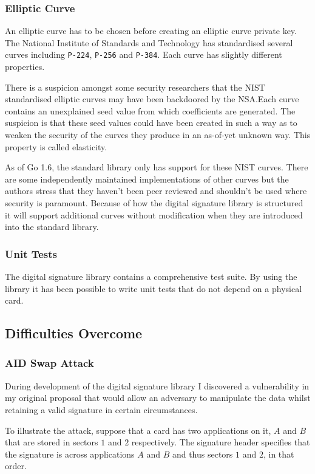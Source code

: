 \documentclass[dissertation.tex]{subfiles}
\begin{document}
  \subsubsection{Elliptic Curve}
  An elliptic curve has to be chosen before creating an elliptic curve private key. The National Institute of Standards and Technology has standardised several curves including \texttt{P-224}, \texttt{P-256} and \texttt{P-384}. Each curve has slightly different properties.

  There is a suspicion amongst some security researchers that the NIST standardised elliptic curves may have been backdoored by the NSA.\@ Each curve contains an unexplained seed value from which coefficients are generated. The suspicion is that these seed values could have been created in such a way as to weaken the security of the curves they produce in an as-of-yet unknown way. This property is called elasticity.

  As of Go 1.6, the standard library only has support for these NIST curves. There are some independently maintained implementations of other curves but the authors stress that they haven't been peer reviewed and shouldn't be used where security is paramount. Because of how the digital signature library is structured it will support additional curves without modification when they are introduced into the standard library.

  \subsubsection{Unit Tests}

  The digital signature library contains a comprehensive test suite. By using the \mifare{} library it has been possible to write unit tests that do not depend on a physical card.

  \subsection{Difficulties Overcome}
  \subsubsection{AID Swap Attack}
  During development of the digital signature library I discovered a vulnerability in my original proposal that would allow an adversary to manipulate the data whilst retaining a valid signature in certain circumstances.

  To illustrate the attack, suppose that a card has two applications on it, $A$ and $B$ that are stored in sectors $1$ and $2$ respectively. The signature header specifies that the signature is across applications $A$ and $B$ and thus sectors $1$ and $2$, in that order.
\end{document}
